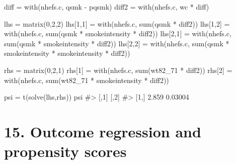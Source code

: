 \documentclass[
  10pt,
  a4paper,
]{book}
\newenvironment{Shaded}{\begin{snugshade}}{\end{snugshade}}
\newcommand{\CommentTok}[1]{\textcolor[rgb]{0.37,0.37,0.37}{#1}}
\newcommand{\DecValTok}[1]{\textcolor[rgb]{0.68,0.00,0.00}{#1}}
\newcommand{\FunctionTok}[1]{\textcolor[rgb]{0.28,0.35,0.67}{#1}}
\newcommand{\NormalTok}[1]{\textcolor[rgb]{0.00,0.46,0.62}{#1}}
\newcommand{\OtherTok}[1]{\textcolor[rgb]{0.00,0.46,0.62}{#1}}
\newcommand{\SpecialCharTok}[1]{\textcolor[rgb]{0.37,0.37,0.37}{#1}}
\begin{document}
\begin{Shaded}
\begin{Highlighting}[]
\NormalTok{diff }\OtherTok{=} \FunctionTok{with}\NormalTok{(nhefs.c, qsmk }\SpecialCharTok{{-}}\NormalTok{ pqsmk)}
\NormalTok{diff2 }\OtherTok{=} \FunctionTok{with}\NormalTok{(nhefs.c, wc }\SpecialCharTok{*}\NormalTok{ diff)}

\NormalTok{lhs }\OtherTok{=} \FunctionTok{matrix}\NormalTok{(}\DecValTok{0}\NormalTok{,}\DecValTok{2}\NormalTok{,}\DecValTok{2}\NormalTok{)}
\NormalTok{lhs[}\DecValTok{1}\NormalTok{,}\DecValTok{1}\NormalTok{] }\OtherTok{=} \FunctionTok{with}\NormalTok{(nhefs.c, }\FunctionTok{sum}\NormalTok{(qsmk }\SpecialCharTok{*}\NormalTok{ diff2))}
\NormalTok{lhs[}\DecValTok{1}\NormalTok{,}\DecValTok{2}\NormalTok{] }\OtherTok{=} \FunctionTok{with}\NormalTok{(nhefs.c, }\FunctionTok{sum}\NormalTok{(qsmk }\SpecialCharTok{*}\NormalTok{ smokeintensity  }\SpecialCharTok{*}\NormalTok{ diff2))}
\NormalTok{lhs[}\DecValTok{2}\NormalTok{,}\DecValTok{1}\NormalTok{] }\OtherTok{=} \FunctionTok{with}\NormalTok{(nhefs.c, }\FunctionTok{sum}\NormalTok{(qsmk }\SpecialCharTok{*}\NormalTok{ smokeintensity }\SpecialCharTok{*}\NormalTok{ diff2))}
\NormalTok{lhs[}\DecValTok{2}\NormalTok{,}\DecValTok{2}\NormalTok{] }\OtherTok{=} \FunctionTok{with}\NormalTok{(nhefs.c, }\FunctionTok{sum}\NormalTok{(qsmk }\SpecialCharTok{*}\NormalTok{ smokeintensity }\SpecialCharTok{*}\NormalTok{ smokeintensity }\SpecialCharTok{*}\NormalTok{ diff2))}

\NormalTok{rhs }\OtherTok{=} \FunctionTok{matrix}\NormalTok{(}\DecValTok{0}\NormalTok{,}\DecValTok{2}\NormalTok{,}\DecValTok{1}\NormalTok{)}
\NormalTok{rhs[}\DecValTok{1}\NormalTok{] }\OtherTok{=} \FunctionTok{with}\NormalTok{(nhefs.c, }\FunctionTok{sum}\NormalTok{(wt82\_71 }\SpecialCharTok{*}\NormalTok{ diff2))}
\NormalTok{rhs[}\DecValTok{2}\NormalTok{] }\OtherTok{=} \FunctionTok{with}\NormalTok{(nhefs.c, }\FunctionTok{sum}\NormalTok{(wt82\_71 }\SpecialCharTok{*}\NormalTok{ smokeintensity }\SpecialCharTok{*}\NormalTok{ diff2))}

\NormalTok{psi }\OtherTok{=} \FunctionTok{t}\NormalTok{(}\FunctionTok{solve}\NormalTok{(lhs,rhs))}
\NormalTok{psi}
\CommentTok{\#\textgreater{}       [,1]    [,2]}
\CommentTok{\#\textgreater{} [1,] 2.859 0.03004}
\end{Highlighting}
\end{Shaded}

\chapter*{15. Outcome regression and propensity scores}\label{outcome-regression-and-propensity-scores}
\end{document}
